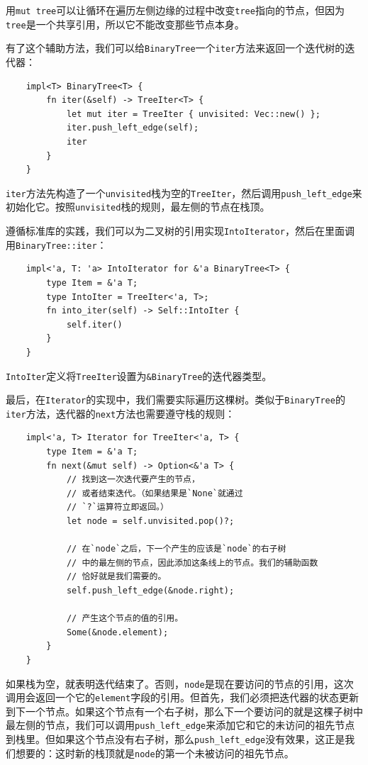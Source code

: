用\texttt{mut tree}可以让循环在遍历左侧边缘的过程中改变\texttt{tree}指向的节点，但因为\texttt{tree}是一个共享引用，所以它不能改变那些节点本身。

有了这个辅助方法，我们可以给\texttt{BinaryTree}一个\texttt{iter}方法来返回一个迭代树的迭代器：
\begin{verbatim}
    impl<T> BinaryTree<T> {
        fn iter(&self) -> TreeIter<T> {
            let mut iter = TreeIter { unvisited: Vec::new() };
            iter.push_left_edge(self);
            iter
        }
    }
\end{verbatim}

\texttt{iter}方法先构造了一个\texttt{unvisited}栈为空的\texttt{TreeIter}，然后调用\texttt{push\_left\_edge}来初始化它。按照\texttt{unvisited}栈的规则，最左侧的节点在栈顶。

遵循标准库的实践，我们可以为二叉树的引用实现\texttt{IntoIterator}，然后在里面调用\texttt{BinaryTree::iter}：
\begin{verbatim}
    impl<'a, T: 'a> IntoIterator for &'a BinaryTree<T> {
        type Item = &'a T;
        type IntoIter = TreeIter<'a, T>;
        fn into_iter(self) -> Self::IntoIter {
            self.iter()
        }
    }
\end{verbatim}

\texttt{IntoIter}定义将\texttt{TreeIter}设置为\texttt{\&BinaryTree}的迭代器类型。

最后，在\texttt{Iterator}的实现中，我们需要实际遍历这棵树。类似于\texttt{BinaryTree}的\texttt{iter}方法，迭代器的\texttt{next}方法也需要遵守栈的规则：
\begin{verbatim}
    impl<'a, T> Iterator for TreeIter<'a, T> {
        type Item = &'a T;
        fn next(&mut self) -> Option<&'a T> {
            // 找到这一次迭代要产生的节点，
            // 或者结束迭代。（如果结果是`None`就通过
            // `?`运算符立即返回。）
            let node = self.unvisited.pop()?;

            // 在`node`之后，下一个产生的应该是`node`的右子树
            // 中的最左侧的节点，因此添加这条线上的节点。我们的辅助函数
            // 恰好就是我们需要的。
            self.push_left_edge(&node.right);

            // 产生这个节点的值的引用。
            Some(&node.element);
        }
    }
\end{verbatim}

如果栈为空，就表明迭代结束了。否则，\texttt{node}是现在要访问的节点的引用，这次调用会返回一个它的\texttt{element}字段的引用。但首先，我们必须把迭代器的状态更新到下一个节点。如果这个节点有一个右子树，那么下一个要访问的就是这棵子树中最左侧的节点，我们可以调用\texttt{push\_left\_edge}来添加它和它的未访问的祖先节点到栈里。但如果这个节点没有右子树，那么\texttt{push\_left\_edge}没有效果，这正是我们想要的：这时新的栈顶就是\texttt{node}的第一个未被访问的祖先节点。

